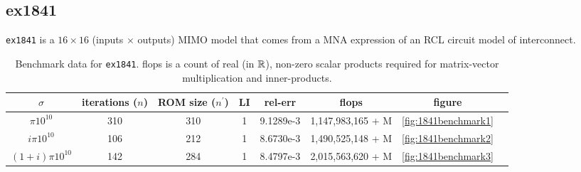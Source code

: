 \begin{table}
\caption{\label{tab:308test2} Here are the most converged eigenvalues of each cycle of the same example, except that we kept no Ritz values from cycle to cycle.}
\end{table}


\clearpage
\subsection{ex1841}
\texttt{ex1841} is a $16\times 16$ (inputs $\times$ outputs) MIMO model that comes from a MNA expression of an RCL circuit model of interconnect.

\begin{table}[h]
\centering
\begin{tabular}{|c|c|c|c|c|c|c|c|}
\hline
$\sigma$ & iterations ($n$) & ROM size ($n^\prime$) & LI &rel-err  & flops & figure  \\
\hline
$\pi 10^{10}$  & 310 &310 & 1 & 9.1289e-3 &   1,147,983,165 + M& \ref{fig:1841benchmark1}  \\
$i \pi  10^{10}$ &  106 & 212& 1 & 8.6730e-3 &  1,490,525,148 + M  &\ref{fig:1841benchmark2} \\
$(1+i)\pi 10^{10}$ & 142 & 284& 1&  8.4797e-3 &  2,015,563,620 + M&\ref{fig:1841benchmark3} \\
\hline
\end{tabular}
\caption{\label{tab:1841tab1}Benchmark data for \texttt{ex1841}.  flops is a count of real (in $\mathbb{R}$), non-zero scalar products required for matrix-vector multiplication and inner-products. }
\end{table}



